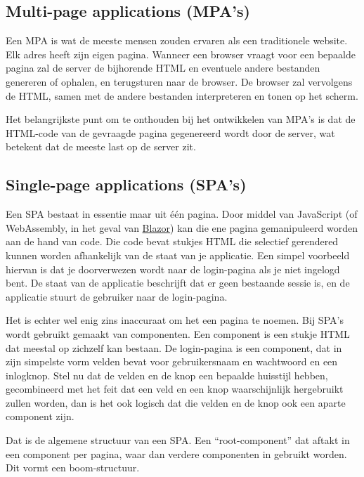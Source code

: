 \subsection{Multi-page applications (MPA's)}

Een MPA is wat de meeste mensen zouden ervaren als een traditionele website. Elk adres heeft zijn eigen pagina. Wanneer een browser vraagt voor een bepaalde pagina zal de server de bijhorende HTML en eventuele andere bestanden genereren of ophalen, en terugsturen naar de browser. De browser zal vervolgens de HTML, samen met de andere bestanden interpreteren en tonen op het scherm.

Het belangrijkste punt om te onthouden bij het ontwikkelen van MPA's is dat de HTML-code van de gevraagde pagina gegenereerd wordt door de server, wat betekent dat de meeste last op de server zit.

\subsection{Single-page applications (SPA's)}

Een SPA bestaat in essentie maar uit één pagina. Door middel van JavaScript (of WebAssembly, in het geval van \href{https://dotnet.microsoft.com/en-us/apps/aspnet/web-apps/blazor}{Blazor}) kan die ene pagina gemanipuleerd worden aan de hand van code. Die code bevat stukjes HTML die selectief gerendered kunnen worden afhankelijk van de staat van je applicatie. Een simpel voorbeeld hiervan is dat je doorverwezen wordt naar de login-pagina als je niet ingelogd bent. De staat van de applicatie beschrijft dat er geen bestaande sessie is, en de applicatie stuurt de gebruiker naar de login-pagina.

Het is echter wel enig zins inaccuraat om het een pagina te noemen. Bij SPA's wordt gebruikt gemaakt van componenten. Een component is een stukje HTML dat meestal op zichzelf kan bestaan. De login-pagina is een component, dat in zijn simpelste vorm velden bevat voor gebruikersnaam en wachtwoord en een inlogknop. Stel nu dat de velden en de knop een bepaalde huisstijl hebben, gecombineerd met het feit dat een veld en een knop waarschijnlijk hergebruikt zullen worden, dan is het ook logisch dat die velden en de knop ook een aparte component zijn.

Dat is de algemene structuur van een SPA. Een ``root-component'' dat aftakt in een component per pagina, waar dan verdere componenten in gebruikt worden. Dit vormt een boom-structuur.

